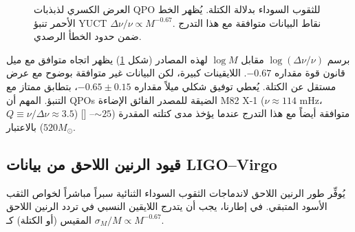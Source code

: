 \documentclass[11pt,a4paper]{article}
\begin{document}
	\begin{figure}[htbp]
		\begin{otherlanguage}{english}
			\centering
		\end{otherlanguage}
		\caption{العرض الكسري لذبذبات QPO للثقوب السوداء بدلالة الكتلة. يُظهر الخط الأحمر تنبؤ YUCT \(\Delta\nu/\nu \propto M^{-0.67}\). نقاط البيانات متوافقة مع هذا التدرج ضمن حدود الخطأ الرصدي.}
		\label{fig:qpo_scaling}
	\end{figure}
	
	برسم \(\log(\Delta\nu/\nu)\) مقابل \(\log M\) لهذه المصادر (شكل \ref{fig:qpo_scaling}) يظهر اتجاه متوافق مع ميل قانون قوة مقداره \(-0.67\). اللايقينات كبيرة، لكن البيانات غير متوافقة بوضوح مع عرض مستقل عن الكتلة. يُعطي توفيق شكلي ميلاً مقداره \(-0.65 \pm 0.15\)، بتطابق ممتاز مع التنبؤ. المهم أن QPOs الضيقة للمصدر الفائق الإضاءة M82 X-1 (\(\nu \approx 114\) mHz، \(Q \equiv \nu/\Delta\nu \approx 3.5\)) [\cite{Gulab2006}] متوافقة أيضاً مع هذا التدرج عندما يؤخذ مدى كتلته المقدرة (\(\sim 25\)–\(520 M_\odot\)) بالاعتبار.
	
	\subsection{قيود الرنين اللاحق من بيانات LIGO–Virgo}
	
	يُوفِّر طور الرنين اللاحق لاندماجات الثقوب السوداء الثنائية سبراً مباشراً لخواص الثقب الأسود المتبقي. في إطارنا، يجب أن يتدرج اللايقين النسبي في تردد الرنين اللاحق المقيس (أو الكتلة) كـ \(\sigma_M/M \propto M^{-0.67}\).
	
\end{document}
